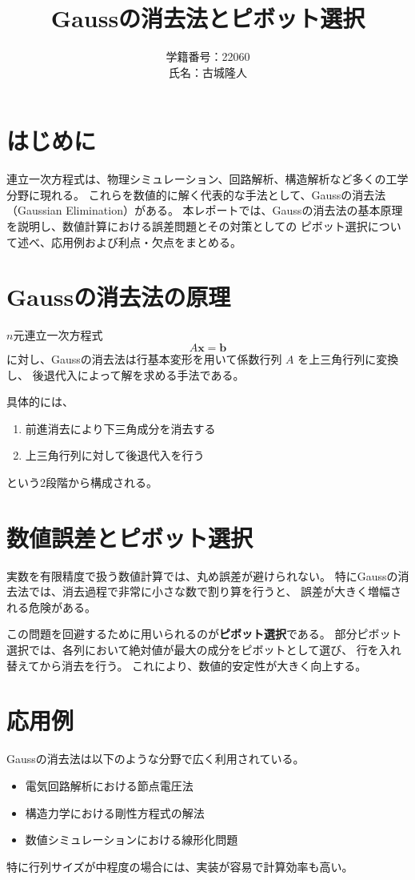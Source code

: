 \documentclass[a4paper,11pt]{article}
\title{Gaussの消去法とピボット選択}
\author{学籍番号：22060 \\ 氏名：古城隆人}
\date{}
\begin{document}
\maketitle

\section{はじめに}
連立一次方程式は、物理シミュレーション、回路解析、構造解析など多くの工学分野に現れる。
これらを数値的に解く代表的な手法として、Gaussの消去法（Gaussian Elimination）がある。
本レポートでは、Gaussの消去法の基本原理を説明し、数値計算における誤差問題とその対策としての
ピボット選択について述べ、応用例および利点・欠点をまとめる。

\section{Gaussの消去法の原理}
$n$元連立一次方程式
\[
A\mathbf{x} = \mathbf{b}
\]
に対し、Gaussの消去法は行基本変形を用いて係数行列 $A$ を上三角行列に変換し、
後退代入によって解を求める手法である。

具体的には、
\begin{enumerate}
  \item 前進消去により下三角成分を消去する
  \item 上三角行列に対して後退代入を行う
\end{enumerate}
という2段階から構成される。

\section{数値誤差とピボット選択}
実数を有限精度で扱う数値計算では、丸め誤差が避けられない。
特にGaussの消去法では、消去過程で非常に小さな数で割り算を行うと、
誤差が大きく増幅される危険がある。

この問題を回避するために用いられるのが\textbf{ピボット選択}である。
部分ピボット選択では、各列において絶対値が最大の成分をピボットとして選び、
行を入れ替えてから消去を行う。
これにより、数値的安定性が大きく向上する。

\section{応用例}
Gaussの消去法は以下のような分野で広く利用されている。
\begin{itemize}
  \item 電気回路解析における節点電圧法
  \item 構造力学における剛性方程式の解法
  \item 数値シミュレーションにおける線形化問題
\end{itemize}
特に行列サイズが中程度の場合には、実装が容易で計算効率も高い。
\end{document}
